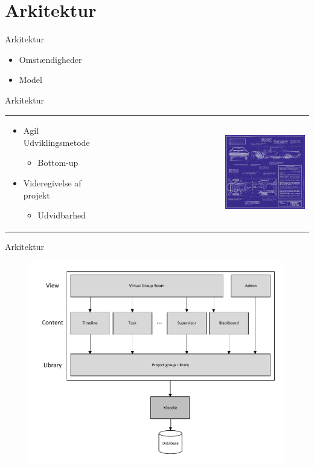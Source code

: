 \section{Arkitektur}

\begin{frame}{Arkitektur}
\begin{itemize}
	\item Omst\ae{}ndigheder
	\item Model
\end{itemize}
\end{frame}


\begin{frame}{Arkitektur}

\begin{tabular}{ p{6cm}  r }
\begin{itemize}
	\item Agil Udviklingsmetode
	\begin{itemize}
		\item Bottom-up  
	\end{itemize}
	\item Videregivelse af projekt
	\begin{itemize}
		\item Udvidbarhed
	\end{itemize}
\end{itemize} 
& \includegraphics[width=0.40\textwidth]{input/assets/Blueprint} \\
\end{tabular}



\end{frame}


\begin{frame}{Arkitektur}
\begin{figure}%
\includegraphics[width=\columnwidth]{input/assets/architecture}%
\end{figure}	
\end{frame}